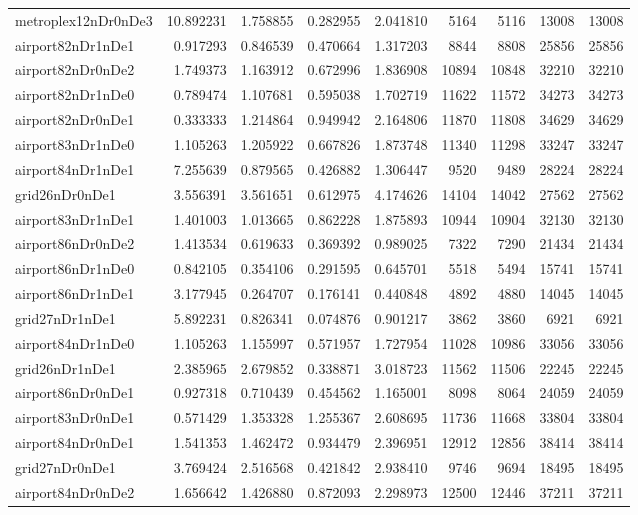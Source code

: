 \begin{longtable}{|l|r|r|r|r|r|r|r|r|}
metroplex12nDr0nDe3 & 10.892231 & 1.758855 & 0.282955 & 2.041810 & 5164 & 5116 & 13008 & 13008 \\
airport82nDr1nDe1 & 0.917293 & 0.846539 & 0.470664 & 1.317203 & 8844 & 8808 & 25856 & 25856 \\
airport82nDr0nDe2 & 1.749373 & 1.163912 & 0.672996 & 1.836908 & 10894 & 10848 & 32210 & 32210 \\
airport82nDr1nDe0 & 0.789474 & 1.107681 & 0.595038 & 1.702719 & 11622 & 11572 & 34273 & 34273 \\
airport82nDr0nDe1 & 0.333333 & 1.214864 & 0.949942 & 2.164806 & 11870 & 11808 & 34629 & 34629 \\
airport83nDr1nDe0 & 1.105263 & 1.205922 & 0.667826 & 1.873748 & 11340 & 11298 & 33247 & 33247 \\
airport84nDr1nDe1 & 7.255639 & 0.879565 & 0.426882 & 1.306447 & 9520 & 9489 & 28224 & 28224 \\
grid26nDr0nDe1 & 3.556391 & 3.561651 & 0.612975 & 4.174626 & 14104 & 14042 & 27562 & 27562 \\
airport83nDr1nDe1 & 1.401003 & 1.013665 & 0.862228 & 1.875893 & 10944 & 10904 & 32130 & 32130 \\
airport86nDr0nDe2 & 1.413534 & 0.619633 & 0.369392 & 0.989025 & 7322 & 7290 & 21434 & 21434 \\
airport86nDr1nDe0 & 0.842105 & 0.354106 & 0.291595 & 0.645701 & 5518 & 5494 & 15741 & 15741 \\
airport86nDr1nDe1 & 3.177945 & 0.264707 & 0.176141 & 0.440848 & 4892 & 4880 & 14045 & 14045 \\
grid27nDr1nDe1 & 5.892231 & 0.826341 & 0.074876 & 0.901217 & 3862 & 3860 & 6921 & 6921 \\
airport84nDr1nDe0 & 1.105263 & 1.155997 & 0.571957 & 1.727954 & 11028 & 10986 & 33056 & 33056 \\
grid26nDr1nDe1 & 2.385965 & 2.679852 & 0.338871 & 3.018723 & 11562 & 11506 & 22245 & 22245 \\
airport86nDr0nDe1 & 0.927318 & 0.710439 & 0.454562 & 1.165001 & 8098 & 8064 & 24059 & 24059 \\
airport83nDr0nDe1 & 0.571429 & 1.353328 & 1.255367 & 2.608695 & 11736 & 11668 & 33804 & 33804 \\
airport84nDr0nDe1 & 1.541353 & 1.462472 & 0.934479 & 2.396951 & 12912 & 12856 & 38414 & 38414 \\
grid27nDr0nDe1 & 3.769424 & 2.516568 & 0.421842 & 2.938410 & 9746 & 9694 & 18495 & 18495 \\
airport84nDr0nDe2 & 1.656642 & 1.426880 & 0.872093 & 2.298973 & 12500 & 12446 & 37211 & 37211 \\

\end{longtable}
